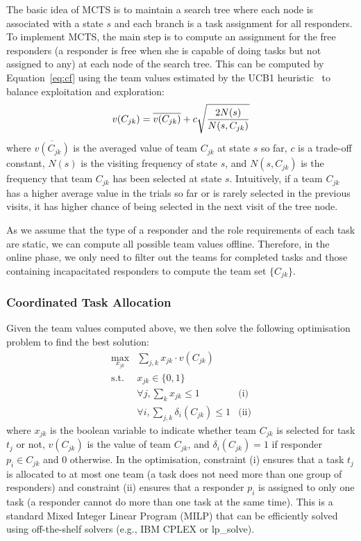 The basic idea of MCTS is to maintain a search tree where each node
is associated with a state $s$ and each branch is a task assignment
for all responders. To implement MCTS, the main step is to compute
an assignment for the free responders (a responder is free when she
is capable of doing tasks but not assigned to any) at each
node of the search tree. This can be computed by
Equation~\ref{eq:cf} using the team values estimated by the UCB1
heuristic~\cite{auer2002finite} to balance exploitation and
exploration:
\begin{equation}\small
  v(C_{jk}) = \overline{v(C_{jk})} + c\sqrt{\frac{2N(s)}{N(s, C_{jk})}}
\end{equation}
where $\overline{v(C_{jk})}$ is the averaged value of team $C_{jk}$
at state $s$ so far, $c$ is a trade-off constant, $N(s)$ is the
visiting frequency of state $s$, and $N(s, C_{jk})$ is the
frequency that team $C_{jk}$ has been selected at state $s$.
Intuitively, if a team $C_{jk}$ has  a higher average value in the
trials so far or is rarely selected in the previous visits, it has
higher chance of being selected in the next visit of the tree node.

As we assume that the type of a responder and the role requirements
of each task are static, we can compute all possible team values
offline. Therefore, in the online phase, we only need to filter out
the teams for completed tasks and those containing
incapacitated responders to compute the team set $\{ C_{jk} \}$.

\subsubsection{Coordinated Task Allocation}
\noindent Given the team values computed above, we then solve the
following optimisation problem to find the best solution:
\begin{equation}
  \begin{array}{lll}
    \max\limits_{x_{jk}} & \sum_{j, k} x_{jk} \cdot v(C_{jk}) & \\[2pt]
    \mbox{s.t.} & x_{jk} \in \{0, 1\} & \\[2pt]
    & \forall j, \sum_{k} x_{jk} \leq 1 & \mbox{(i)} \\[2pt]
    & \forall i, \sum_{j, k} \delta_i(C_{jk}) \leq 1 & \mbox{(ii)}
  \end{array}
  \label{eq:cf}
\end{equation}
where $x_{jk}$ is the boolean variable to indicate whether team
$C_{jk}$ is selected for task $t_j$ or not, $v(C_{jk})$ is the value of team $C_{jk}$, and $\delta_i(C_{jk}) =
1$ if responder $p_i\in C_{jk}$ and 0 otherwise. In the
optimisation, constraint (i) ensures that a task $t_j$ is allocated
to at most one team (a task does not need more than one group of
responders) and constraint (ii) ensures that a responder $p_i$ is
assigned to only one task (a responder cannot do more than one task
at the same time). This is a standard Mixed Integer Linear Program
(MILP) that can be efficiently solved  using off-the-shelf solvers (e.g., IBM CPLEX or lp\_solve).

